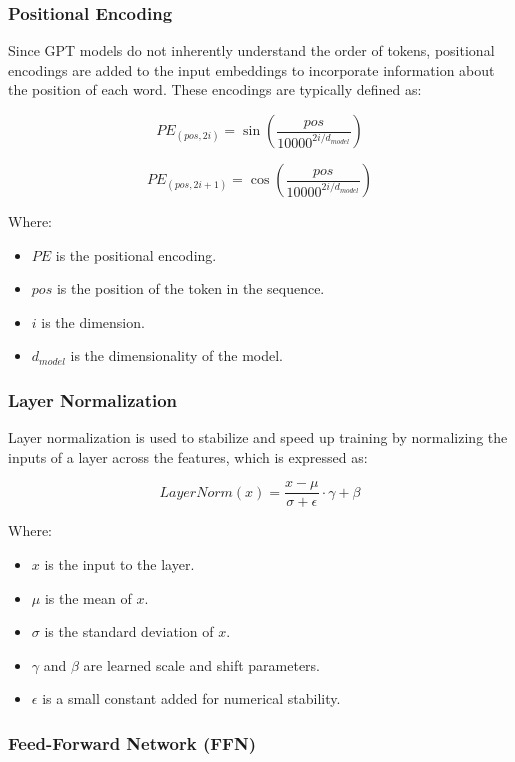 \documentclass{article}
\begin{document}
\subsubsection{Positional Encoding}
Since GPT models do not inherently understand the order of tokens, positional encodings are added to the input embeddings to incorporate information about the position of each word. These encodings are typically defined as:

\[ PE_{(pos, 2i)} = \sin\left(\frac{pos}{10000^{2i/d_{model}}}\right) \]

\[ PE_{(pos, 2i+1)} = \cos\left(\frac{pos}{10000^{2i/d_{model}}}\right) \]

Where:
\begin{itemize}
    \item \( PE \) is the positional encoding.
    \item \( pos \) is the position of the token in the sequence.
    \item \( i \) is the dimension.
    \item \( d_{model} \) is the dimensionality of the model.
\end{itemize}

\subsubsection{Layer Normalization}

Layer normalization is used to stabilize and speed up training by normalizing the inputs of a layer across the features, which is expressed as:

\[ \textit{LayerNorm}(x) = \frac{x - \mu}{\sigma + \epsilon} \cdot \gamma + \beta \]

Where:
\begin{itemize}
    \item \( x \) is the input to the layer.
    \item \( \mu \) is the mean of \( x \).
    \item \( \sigma \) is the standard deviation of \( x \).
    \item \( \gamma \) and \( \beta \) are learned scale and shift parameters.
    \item \( \epsilon \) is a small constant added for numerical stability.
\end{itemize}

\subsubsection{Feed-Forward Network (FFN)}
\end{document}
